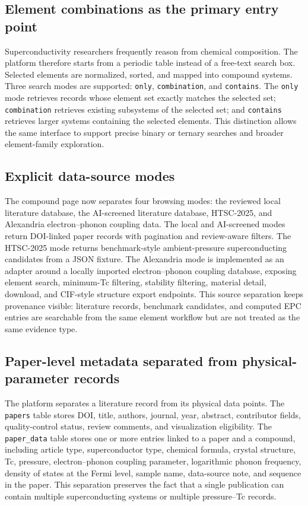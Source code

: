 \documentclass[11pt,a4paper]{article}
\begin{document}
\subsection{Element combinations as the primary entry point}

Superconductivity researchers frequently reason from chemical composition. The platform therefore starts from a periodic table instead of a free-text search box. Selected elements are normalized, sorted, and mapped into compound systems. Three search modes are supported: \texttt{only}, \texttt{combination}, and \texttt{contains}. The \texttt{only} mode retrieves records whose element set exactly matches the selected set; \texttt{combination} retrieves existing subsystems of the selected set; and \texttt{contains} retrieves larger systems containing the selected elements. This distinction allows the same interface to support precise binary or ternary searches and broader element-family exploration.

\subsection{Explicit data-source modes}

The compound page now separates four browsing modes: the reviewed local literature database, the AI-screened literature database, HTSC-2025, and Alexandria electron--phonon coupling data. The local and AI-screened modes return DOI-linked paper records with pagination and review-aware filters. The HTSC-2025 mode returns benchmark-style ambient-pressure superconducting candidates from a JSON fixture. The Alexandria mode is implemented as an adapter around a locally imported electron--phonon coupling database, exposing element search, minimum-Tc filtering, stability filtering, material detail, download, and CIF-style structure export endpoints. This source separation keeps provenance visible: literature records, benchmark candidates, and computed EPC entries are searchable from the same element workflow but are not treated as the same evidence type.

\subsection{Paper-level metadata separated from physical-parameter records}

The platform separates a literature record from its physical data points. The \texttt{papers} table stores DOI, title, authors, journal, year, abstract, contributor fields, quality-control status, review comments, and visualization eligibility. The \texttt{paper\_data} table stores one or more entries linked to a paper and a compound, including article type, superconductor type, chemical formula, crystal structure, Tc, pressure, electron--phonon coupling parameter, logarithmic phonon frequency, density of states at the Fermi level, sample name, data-source note, and sequence in the paper. This separation preserves the fact that a single publication can contain multiple superconducting systems or multiple pressure--Tc records.
\end{document}
